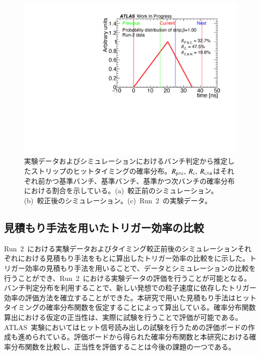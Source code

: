 \begin{figure}[H]
\begin{minipage}{0.33\hsize}
    \subcaption{}
    \end{minipage}
    \begin{minipage}{0.33\hsize}
    \centering   
    \includegraphics[width=\textwidth,page=1]{img/rec/rec_data_s.pdf}
    \subcaption{}
    \end{minipage} 
    \caption[実験データおよびシミュレーションにおけるバンチ判定から推定したストリップのヒットタイミングの確率分布]{実験データおよびシミュレーションにおけるバンチ判定から推定したストリップのヒットタイミングの確率分布。$R_{\rm{p{\land}c}},~R_{\rm{c}},~R_{\rm{c{\land}n}}$はそれぞれ前かつ基準バンチ、基準バンチ、基準かつ次バンチの確率分布における割合を示している。(a)~較正前のシミュレーション。(b)~較正後のシミュレーション。(c)~Run~2~の実験データ。}\label{fig:recall1}
\end{figure}

\subsection{見積もり手法を用いたトリガー効率の比較}
Run~2~における実験データおよびタイミング較正前後のシミュレーションそれぞれにおける見積もり手法をもとに算出したトリガー効率の比較をに示した。トリガー効率の見積もり手法を用いることで、データとシミュレーションの比較を行うことができ、Run~2~における実験データの評価を行うことが可能となる。バンチ判定分布を利用することで、新しい発想での粒子速度に依存したトリガー効率の評価方法を確立することができた。本研究で用いた見積もり手法はヒットタイミングの確率分布関数を仮定することによって算出している。確率分布関数算出における仮定の正当性は、実際に試験を行うことで評価が可能である。ATLAS~実験においてはヒット信号読み出しの試験を行うための評価ボードの作成も進められている。評価ボードから得られた確率分布関数と本研究における確率分布関数を比較し、正当性を評価することは今後の課題の一つである。


